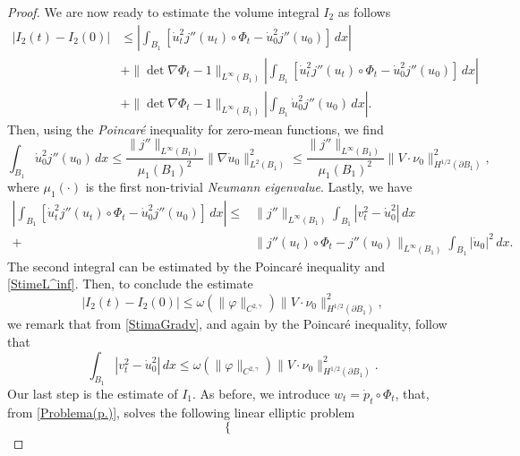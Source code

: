 \documentclass[oneside,a4paper,11pt,notitlepage]{article}
\newcommand{\abs}[1]{{\left|#1\right|}}
\theoremstyle{definition}
\theoremstyle{plain}
\theoremstyle{definition}
\begin{document}
\begin{proof}
    We are now ready to estimate the volume integral $I_2$ as follows
    \begin{equation*}
        \begin{split}
            \abs{I_2(t)-I_2(0)}&\leq \abs{\int_{B_1}[\dot{u}_t^2j''(u_t)\circ\Phi_t-\dot{u}_0^2j''(u_0)]\,dx}\\
            &+\|\det\nabla\Phi_t-1\|_{L^\infty(B_1)}\abs{\int_{B_1}[\dot{u}_t^2j''(u_t)\circ\Phi_t-\dot{u}_0^2j''(u_0)]\,dx}\\
            &+\|\det\nabla\Phi_t-1\|_{L^\infty(B_1)}\abs{\int_{B_1}\dot{u}_0^2j''(u_0)\,dx}.
        \end{split}
    \end{equation*}
    Then, using the \emph{Poincaré} inequality for zero-mean functions, we find
    \begin{equation*}
        \int_{B_1}\dot{u}_0^2j''(u_0)\,dx\leq\frac{\|j''\|_{L^\infty(B_1)}}{\mu_1(B_1)^2}\|\nabla \dot{u}_0\|_{L^2(B_1)}^2\leq \frac{\|j''\|_{L^\infty(B_1)}}{\mu_1(B_1)^2}\|V\cdot\nu_0\|_{H^{1/2}(\partial B_1)}^2,
    \end{equation*}
    where $\mu_1(\cdot)$ is the first non-trivial \emph{Neumann eigenvalue}. Lastly, we have
    \begin{equation*}
        \begin{split}
            \abs{\int_{B_1}[\dot{u}_t^2j''(u_t)\circ\Phi_t-\dot{u}_0^2j''(u_0)]\,dx}\leq& \|j''\|_{L^\infty(B_1)}\int_{B_1}\abs{v_t^2-\dot{u}_0^2}\,dx\\
            +&\|j''(u_t)\circ\Phi_t-j''(u_0)\|_{L^\infty(B_1)}\int_{B_1}\abs{\dot{u}_0}^2\,dx.
        \end{split}
    \end{equation*}
    The second integral can be estimated by the Poincaré inequality and \eqref{StimeL^inf}. Then, to conclude the estimate $$|I_2(t)-I_2(0)|\leq\omega(\|\varphi\|_{C^{2,\gamma}})\|V\cdot\nu_0\|_{H^{1/2}(\partial B_1)}^2,$$ we remark that from \eqref{StimaGradv}, and again by the Poincaré inequality, follow that
    \begin{equation*}
        \int_{B_1}\abs{v_t^2-\dot{u}_0^2}\,dx\leq\omega(\|\varphi\|_{C^{2,\gamma}})\|V\cdot\nu_0\|_{H^{1/2}(\partial B_1)}^2.
    \end{equation*}
    Our last step is the estimate of $I_1$. As before, we introduce $w_t=\dot{p}_t\circ\Phi_t$, that, from \eqref{Problema(p.)}, solves the following linear elliptic problem
    \begin{equation}\label{Problema(w)}
        \begin{cases}

\end{cases}
\end{equation}
\end{proof}
\end{document}
